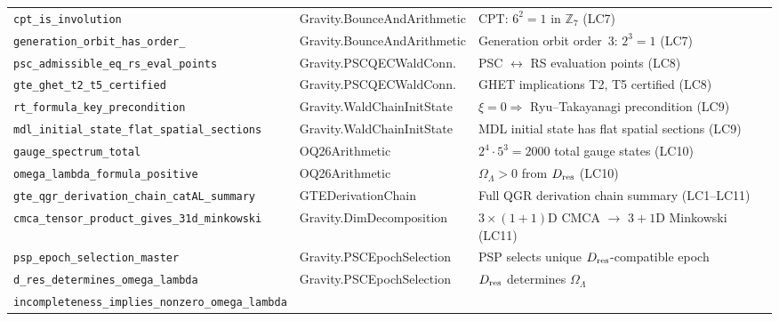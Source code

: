 \documentclass[11pt,a4paper]{article}
\theoremstyle{definition}
\begin{document}
\begin{table}[h]
\begin{tabular}{@{}p{5.2cm}p{4.8cm}p{4.0cm}@{}}
\texttt{cpt\_\allowbreak is\_\allowbreak involution}
  & Gravity.BounceAndArithmetic
  & CPT: $6^2=1$ in $\mathbb{Z}_7$ (LC7) \\[1pt]
\texttt{generation\_\allowbreak orbit\_\allowbreak has\_\allowbreak order\_\allowbreak 3}
  & Gravity.BounceAndArithmetic
  & Generation orbit order~3: $2^3=1$ (LC7) \\[1pt]
\texttt{psc\_\allowbreak admissible\_\allowbreak eq\_\allowbreak rs\_\allowbreak eval\_\allowbreak points}
  & Gravity.PSCQECWaldConn.
  & PSC $\leftrightarrow$ RS evaluation points (LC8) \\[1pt]
\texttt{gte\_\allowbreak ghet\_\allowbreak t2\_\allowbreak t5\_\allowbreak certified}
  & Gravity.PSCQECWaldConn.
  & GHET implications T2, T5 certified (LC8) \\[1pt]
\texttt{rt\_\allowbreak formula\_\allowbreak key\_\allowbreak precondition}
  & Gravity.WaldChainInitState
  & $\xi=0 \Rightarrow$ Ryu--Takayanagi precondition (LC9) \\[1pt]
\texttt{mdl\_\allowbreak initial\_\allowbreak state\_\allowbreak flat\_\allowbreak spatial\_\allowbreak sections}
  & Gravity.WaldChainInitState
  & MDL initial state has flat spatial sections (LC9) \\[1pt]
\texttt{gauge\_\allowbreak spectrum\_\allowbreak total}
  & OQ26Arithmetic
  & $2^4 \cdot 5^3 = 2000$ total gauge states (LC10) \\[1pt]
\texttt{omega\_\allowbreak lambda\_\allowbreak formula\_\allowbreak positive}
  & OQ26Arithmetic
  & $\Omega_\Lambda > 0$ from $D_{\rm res}$ (LC10) \\[1pt]
\texttt{gte\_\allowbreak qgr\_\allowbreak derivation\_\allowbreak chain\_\allowbreak catAL\_\allowbreak summary}
  & GTEDerivationChain
  & Full QGR derivation chain summary (LC1--LC11) \\[1pt]
\texttt{cmca\_\allowbreak tensor\_\allowbreak product\_\allowbreak gives\_\allowbreak 31d\_\allowbreak minkowski}
  & Gravity.DimDecomposition
  & $3{\times}(1{+}1)$D CMCA $\to$ $3{+}1$D Minkowski (LC11) \\[1pt]
\texttt{psp\_\allowbreak epoch\_\allowbreak selection\_\allowbreak master}
  & Gravity.PSCEpochSelection
  & PSP selects unique $D_{\rm res}$-compatible epoch \\[1pt]
\texttt{d\_\allowbreak res\_\allowbreak determines\_\allowbreak omega\_\allowbreak lambda}
  & Gravity.PSCEpochSelection
  & $D_{\rm res}$ determines $\Omega_\Lambda$ \\[1pt]
\texttt{incompleteness\_\allowbreak implies\_\allowbreak nonzero\_\allowbreak omega\_\allowbreak lambda}

\end{tabular}
\end{table}
\end{document}
